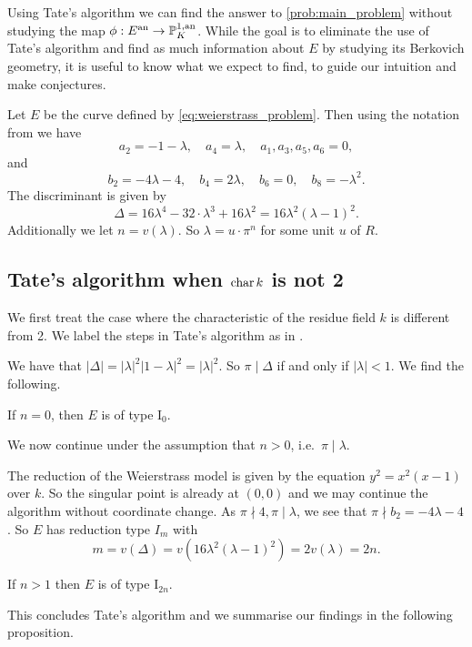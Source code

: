 Using Tate's algorithm we can find the answer to \cref{prob:main_problem} without studying the map $\phi: E{}^{\text{an}} \to \mathbb{P}^{1, \text{an}}_K$. 
While the goal is to eliminate the use of Tate's algorithm and find as much information about $E$ by studying its Berkovich geometry, 
it is useful to know what we expect to find, to guide our intuition and make conjectures. 

Let $E$ be the curve defined by \eqref{eq:weierstrass_problem}. 
Then using the notation from \cite[p.364]{silvermanAdvancedTopicsArithmetic1994} we have \[
a_2 = -1 - \lambda,\quad a_4 = \lambda, \quad a_1, a_3, a_5, a_6 = 0
,\] 
and \[
b_2 = -4 \lambda - 4, \quad b_4 = 2\lambda, \quad b_6 = 0, \quad b_8 = -\lambda ^2
.\] 
The discriminant is given by \[
	\Delta = 16\lambda^4 - 32\cdot \lambda^3 + 16\lambda^2 = 16 \lambda^2(\lambda - 1)^2
.\] 
Additionally we let $n = v(\lambda)$.
So $\lambda = u \cdot \pi^{n}$ for some unit $u$ of $R$.

\subsection{Tate's algorithm when $\operatorname{char} k$ is not 2} \label{sec:char_k_is_not_2}
We first treat the case where the characteristic of the residue field $k$ is different from 2. 
We label the steps in Tate's algorithm as in \cite[sec.\ IV.9]{silvermanAdvancedTopicsArithmetic1994}.

We have that $|\Delta| = |\lambda|^2 |1-\lambda|^2 = |\lambda|^2 $. 
So $\pi \mid \Delta$ if and only if  $|\lambda| < 1$. 
We find the following. 
\begin{tateconclusion}
	If  $n = 0$, then $E$ is of type $\mathrm I_0$. 
\end{tateconclusion}
We now continue under the assumption that $n > 0$, i.e.\ $\pi \mid \lambda$. 

The reduction of the Weierstrass model is given by the equation $y^2 = x^2 (x - 1)$ over $k$. 
So the singular point is already at $(0, 0)$ and we may continue the algorithm without coordinate change. 
As $\pi \nmid 4, \pi \mid \lambda$, we see that $\pi \nmid b_2 = -4\lambda - 4$. 
So $E$ has reduction type $I_m$ with \[
	m = v(\Delta) = v(16 \lambda^2 (\lambda - 1)^2)  = 2v(\lambda) = 2n
.\]
\begin{tateconclusion}
	If $n > 1$ then $E$ is of type $\mathrm I_{2n}$.
\end{tateconclusion}
This concludes Tate's algorithm and we summarise our findings in the following proposition. 

